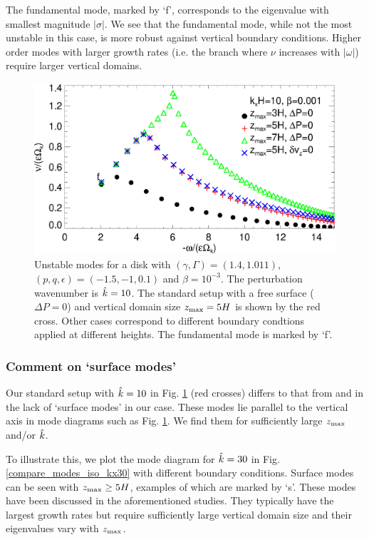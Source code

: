 The fundamental mode, marked by `f', corresponds to the eigenvalue
with smallest magnitude $|\sigma|$. We see that the fundamental mode,
while not the most unstable in this case, is more robust against
vertical boundary conditions. Higher order modes with larger growth
rates (i.e. the branch where $\nu$ increases with $|\omega|$) require
larger vertical domains. 

\begin{figure}
  \includegraphics[width=\linewidth]{figures/compare_modes_iso_kx10.ps}
  \caption{Unstable modes for a disk with 
    $(\gamma,\Gamma)=(1.4,1.011)$, $(p,q,\epsilon)=(-1.5,-1,0.1)$ and
    $\beta=10^{-3}$. The perturbation wavenumber is $\hat{k}=10$. 
    The standard setup with a free surface ($\Delta P=0$) and 
    vertical domain size $z_\mathrm{max}=5H$ is shown by the red cross. Other
    cases correspond to different boundary condtions applied at
    different heights. The fundamental mode is marked by `f'.   
    \label{compare_modes_iso_kx10} 
  }
\end{figure}

\subsubsection{Comment on `surface modes'} 
Our standard setup with $\hat{k}=10$ in 
Fig. \ref{compare_modes_iso_kx10} (red crosses) differs to that from
\cite{nelson13} and \cite{mcnally14} in the lack of `surface modes' in
our case. These modes lie parallel to the vertical axis in mode
diagrams such as Fig. \ref{compare_modes_iso_kx10}. We find them for 
sufficiently large $z_\mathrm{max}$ and/or $\hat{k}$. %

To illustrate this, we plot the mode diagram for $\hat{k}=30$ in  
Fig. \ref{compare_modes_iso_kx30} with different boundary 
conditions. Surface modes can be seen with
$z_\mathrm{max}\geq 5H$, examples of which are marked by `s'. These modes have
been discussed in the aforementioned studies. They typically have the
largest growth rates but require sufficiently large vertical domain
size and their eigenvalues vary with $z_\mathrm{max}$. 

